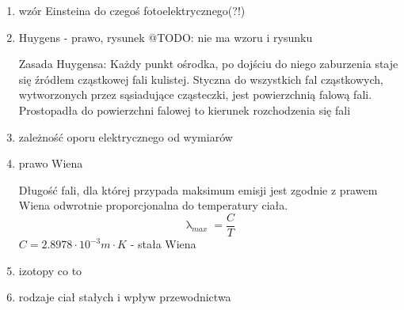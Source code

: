 \documentclass[12pt,a4paper]{article}
\begin{document}
\begin {enumerate}
\item wzór Einsteina do czegoś fotoelektrycznego(?!)

\item Huygens - prawo, rysunek @TODO: nie ma wzoru i rysunku

Zasada Huygensa: Każdy punkt ośrodka, po dojściu do niego zaburzenia staje się źródłem cząstkowej fali kulistej. Styczna do wszystkich fal cząstkowych, wytworzonych przez sąsiadujące cząsteczki, jest powierzchnią falową fali. Prostopadła do powierzchni falowej to kierunek rozchodzenia się fali

\item zależność oporu elektrycznego od wymiarów

\item prawo Wiena

Długość fali, dla której przypada maksimum emisji jest zgodnie z prawem Wiena odwrotnie proporcjonalna do temperatury ciała.
$$\uplambda_{max}=\frac{C}{T}$$
$C = 2.8978\cdot 10^{-3} m\cdot K$ - stała Wiena

\item izotopy co to

\item rodzaje ciał stałych i wpływ przewodnictwa


\end {enumerate}
\end{document}

